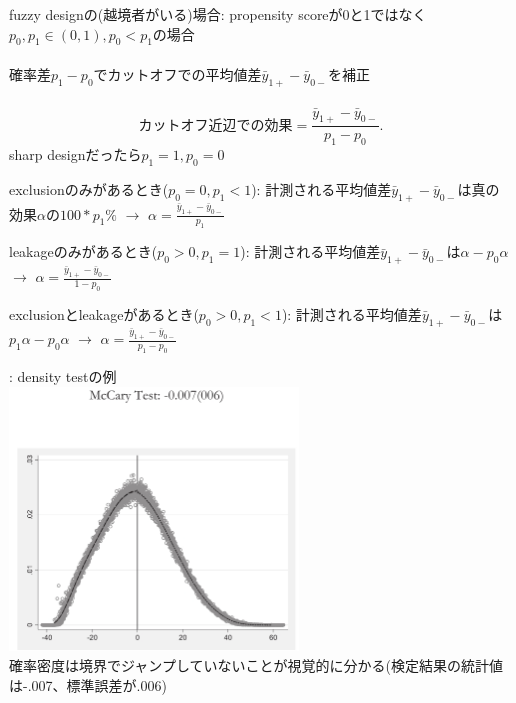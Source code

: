 \begin{frame}{}
fuzzy designの(越境者がいる)場合: propensity scoreが0と1ではなく$p_{0}, p_{1}\in(0,1), p_{0}<p_{1}$の場合\\~\\

\pause
確率差$p_{1}-p_{0}$でカットオフでの平均値差$\bar{y}_{1+}-\bar{y}_{0-}$を補正\\~\\
\pause
\[
\mbox{カットオフ近辺での効果}=\frac{\bar{y}_{1+}-\bar{y}_{0-}}{p_{1}-p_{0}}.
\]
\pause
sharp designだったら$p_{1}=1, p_{0}=0$
\begin{dinglist}{43}
\vspace{1.0ex}\setlength{\itemsep}{1.0ex}\setlength{\baselineskip}{12pt}
\pause
\item	exclusionのみがあるとき($p_{0}=0, p_{1}<1$): 計測される平均値差$\bar{y}_{1+}-\bar{y}_{0-}$は真の効果$\alpha$の$100*p_{1}\%$ \pause
$\rightarrow$ $\alpha=\frac{\bar{y}_{1+}-\bar{y}_{0-}}{p_{1}}$
\pause
\item	leakageのみがあるとき($p_{0}>0, p_{1}=1$): 計測される平均値差$\bar{y}_{1+}-\bar{y}_{0-}$は$\alpha-p_{0}\alpha$\pause
 $\rightarrow$ $\alpha=\frac{\bar{y}_{1+}-\bar{y}_{0-}}{1-p_{0}}$
\pause
\item	exclusionとleakageがあるとき($p_{0}>0, p_{1}<1$): 計測される平均値差$\bar{y}_{1+}-\bar{y}_{0-}$は$p_{1}\alpha-p_{0}\alpha$\pause
 $\rightarrow$ $\alpha=\frac{\bar{y}_{1+}-\bar{y}_{0-}}{p_{1}-p_{0}}$
\end{dinglist}
\end{frame}

\begin{frame}{}
\citet[][Figure 2]{BoschSchady2019}: density testの例\\
\hfil\includegraphics[height = 7cm]{ImpactEvaluation/figure/BoschSchady_DensityTest.jpg}\\
\vspace*{2ex}
確率密度は境界でジャンプしていないことが視覚的に分かる(検定結果の統計値は-.007、標準誤差が.006)
\end{frame}

